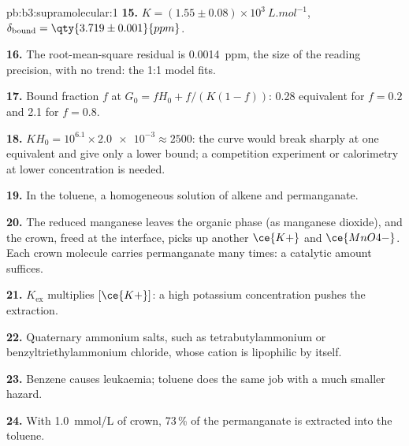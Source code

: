 \begin{solution}{pb:b3:supramolecular:1}
\textbf{15.} $K = (1.55 \pm 0.08) \times 10^3\ \unit{L.mol^{-1}}$, $\delta_{\mathrm{bound}} = \qty{3.719 \pm 0.001}{ppm}$.

\textbf{16.} The root-mean-square residual is \qty{0.0014}{ppm}, the size of the reading
precision, with no trend: the 1:1 model fits.

\textbf{17.} Bound fraction $f$ at $G_0 = fH_0 + f/(K(1 - f))$: 0.28 equivalent for $f = 0.2$ and 2.1 for $f = 0.8$.

\textbf{18.} $KH_0 = 10^{6.1} \times \num{2.0e-3} \approx 2500$: the curve would break sharply at one equivalent
and give only a lower bound; a competition experiment or calorimetry at
lower concentration is needed.

\textbf{19.} In the toluene, a homogeneous solution of alkene and permanganate.

\textbf{20.} The reduced manganese leaves the organic phase (as manganese dioxide),
and the crown, freed at the interface, picks up another $\ce{K+}$ and $\ce{MnO4-}$. Each crown
molecule carries permanganate many times: a catalytic amount suffices.

\textbf{21.} $K_{\mathrm{ex}}$ multiplies $[\ce{K+}]$: a high potassium concentration pushes the extraction.

\textbf{22.} Quaternary ammonium salts, such as tetrabutylammonium or
benzyltriethylammonium chloride, whose cation is lipophilic by itself.

\textbf{23.} Benzene causes leukaemia; toluene does the same job with a much smaller
hazard.

\textbf{24.} With \qty{1.0}{mmol/L} of crown, 73\,\% of the permanganate is extracted into the
toluene.
\end{solution}
